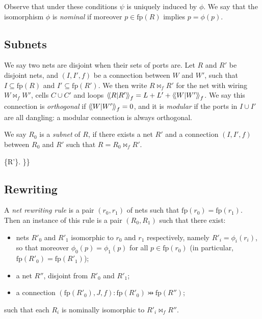 Observe that under these conditions \(\psi\) is uniquely induced by
\(\phi\). We say that the isomorphism \(\phi\) is \emph{nominal} if
moreover \(p\in\textrm{fp}(R)\) implies \(p=\phi(p)\).

\subsection{Subnets}\label{subnets}

We say two nets are disjoint when their sets of ports are. Let \(R\) and
\(R'\) be disjoint nets, and \((I,I',f)\) be a connection between \(W\)
and \(W'\), such that \(I\subseteq \textrm{fp}(R)\) and
\(I'\subseteq \textrm{fp}(R')\). We then write \(R\bowtie_f{R'}\) for
the net with wiring \(W\bowtie_f{W'}\), cells \(C\cup C'\) and loops
\(\left\langle\!\left\langle R\middle|R'\right\rangle\!\right\rangle_f=L+L'+\left\langle\!\left\langle W\middle|W'\right\rangle\!\right\rangle_f\). We say this connection is
\emph{orthogonal} if \(\left\langle\!\left\langle W\middle|W'\right\rangle\!\right\rangle_f=0\), and it is \emph{modular} if
the ports in \(I\cup I'\) are all dangling: a modular connection is
always orthogonal.

We say \(R_0\) is a \emph{subnet} of \(R\), if there exists a net \(R'\)
and a connection \((I,I',f)\) between \(R_0\) and \(R'\) such that
\(R=R_0\bowtie_f{R'}\).

\{R'\}. \}\}

\subsection{Rewriting}\label{rewriting}

A \emph{net rewriting rule} is a pair \((r_0,r_1)\) of nets such that
\(\textrm{fp}(r_0)=\textrm{fp}(r_1)\). Then an instance of this rule is
a pair \((R_0,R_1)\) such that there exist:

\begin{itemize}
\tightlist
\item
  nets \(R'_0\) and \(R'_1\) isomorphic to \(r_0\) and \(r_1\)
  respectively, namely \(R'_i=\phi_i(r_i)\), so that moreover
  \(\phi_0(p)=\phi_1(p)\) for all \(p\in\textrm{fp}(r_0)\) (in
  particular, \(\textrm{fp}(R'_0)=\textrm{fp}(R'_1)\));
\item
  a net \(R''\), disjoint from \(R'_0\) and \(R'_1\);
\item
  a connection
  \((\textrm{fp}(R'_0),J,f):\textrm{fp}(R'_0)\pinj \textrm{fp}(R'')\);
\end{itemize}

such that each \(R_i\) is nominally isomorphic to
\(R'_i\bowtie_f{R''}\).

